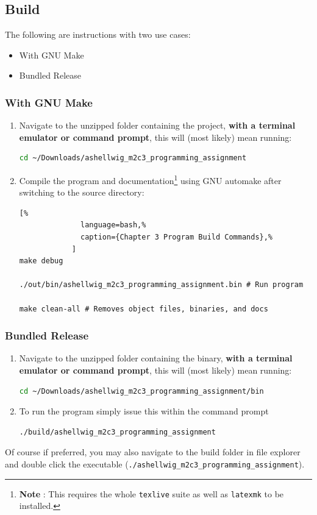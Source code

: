 \documentclass[a4paper, 11pt]{article}
\begin{document}
    \subsection{Build}
      The following are instructions with two use cases:
      \begin{itemize}
        \item With GNU Make
        \item Bundled Release
      \end{itemize}
      \subsubsection{With GNU Make}
        \begin{enumerate}
          \item Navigate to the unzipped folder containing the project,
            \textbf{with a terminal emulator or command prompt}, this will
            (most likely) mean running:
            \begin{lstlisting}[language=bash]
cd ~/Downloads/ashellwig_m2c3_programming_assignment
            \end{lstlisting}
          \item Compile the program and documentation\footnote{\textbf{Note%
            }: This requires the whole \texttt{texlive} suite as well as
            \texttt{latexmk} to be installed.} using GNU automake after
            switching to the source directory:
            \begin{lstlisting}[%
              language=bash,%
              caption={Chapter 3 Program Build Commands},%
            ]
make debug

./out/bin/ashellwig_m2c3_programming_assignment.bin # Run program

make clean-all # Removes object files, binaries, and docs
            \end{lstlisting}
          \end{enumerate}
      \subsubsection{Bundled Release}
        \begin{enumerate}
          \item Navigate to the unzipped folder containing the binary,
            \textbf{with a terminal emulator or command prompt}, this will
            (most likely) mean running:
            \begin{lstlisting}[language=bash]
cd ~/Downloads/ashellwig_m2c3_programming_assignment/bin
            \end{lstlisting}
          \item To run the program simply issue this within the command
            prompt
            \begin{lstlisting}[language=bash]
./build/ashellwig_m2c3_programming_assignment
            \end{lstlisting}
        \end{enumerate}
        Of course if preferred, you may also navigate to the build folder in
          file explorer and double click the executable
          (\texttt{./ashellwig\_m2c3\_programming\_assignment}).
\end{document}
